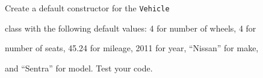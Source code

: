 Create a default constructor for the \texttt{Vehicle}

class with the following default values: 4 for number of wheels, 4 for

number of seats, 45.24 for mileage, 2011 for year, ``Nissan'' for make,

and ``Sentra'' for model. Test your code.

